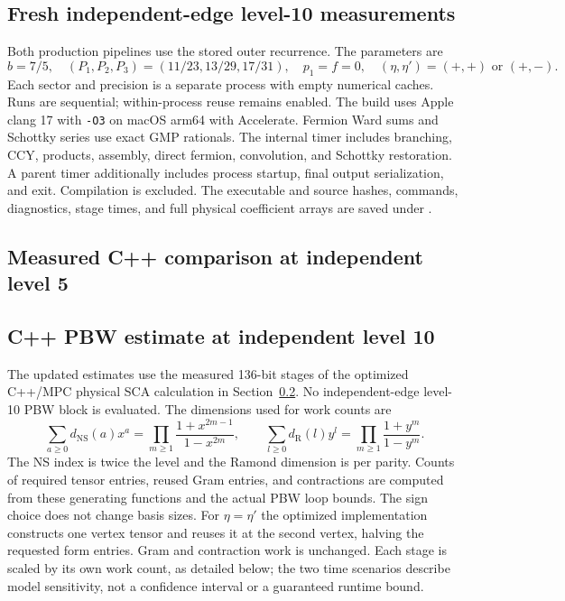 \documentclass[11pt]{article}
\newcommand{\NS}{\mathrm{NS}}
\newcommand{\R}{\mathrm{R}}
\numberwithin{equation}{section}
\begin{document}
\subsection{Fresh independent-edge level-10 measurements}
Both production pipelines use the stored outer recurrence. The parameters are
\begin{equation}
 b=7/5,\quad(P_1,P_2,P_3)=(11/23,13/29,17/31),\quad p_1=f=0,
 \quad(\eta,\eta')=(+,+)\text{ or }(+,-).
\end{equation}
Each sector and precision is a separate process with empty numerical caches.
Runs are sequential; within-process reuse remains enabled. The build uses
Apple clang 17 with \texttt{-O3} on macOS arm64 with Accelerate.
Fermion Ward sums and Schottky series use exact GMP rationals.
The internal timer includes branching, CCY, products, assembly, direct fermion,
convolution, and Schottky restoration. A parent timer additionally includes
process startup, final output serialization, and exit. Compilation is excluded.
The executable and source hashes, commands, diagnostics, stage times, and full
physical coefficient arrays are saved under
.



\clearpage
\subsection{Measured C++ comparison at independent level 5}
\label{sec:pbw-measured}


\subsection{C++ PBW estimate at independent level 10}
\label{sec:pbw-estimate}
The updated estimates use the measured 136-bit stages of the optimized
C++/MPC physical SCA calculation in Section~\ref{sec:pbw-measured}.
No independent-edge level-10 PBW block is evaluated.
The dimensions used for work counts are
\begin{equation}
 \sum_{a\ge0}d_{\NS}(a)x^a=\prod_{m\ge1}\frac{1+x^{2m-1}}{1-x^{2m}},\qquad
 \sum_{l\ge0}d_{\R}(l)y^l=\prod_{m\ge1}\frac{1+y^m}{1-y^m}.
\end{equation}
The NS index is twice the level and the Ramond dimension is per parity.
Counts of required tensor entries, reused Gram entries, and contractions are
computed from these generating functions and the actual PBW loop bounds.
The sign choice does not change basis sizes. For $\eta=\eta'$ the optimized
implementation constructs one vertex tensor and reuses it at the second
vertex, halving the requested form entries. Gram and contraction work is
unchanged. Each stage is scaled by its own work count, as detailed below;
the two time scenarios describe model sensitivity, not a confidence interval
or a guaranteed runtime bound.
\end{document}

